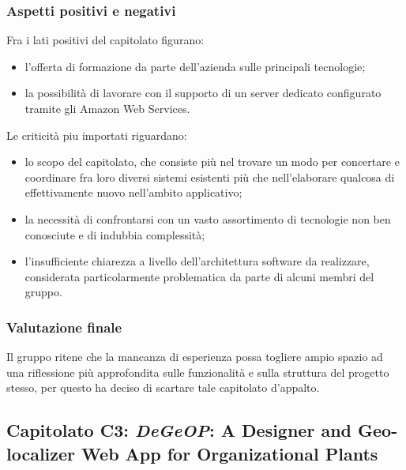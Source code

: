 		\subsubsection{Aspetti positivi e negativi}
		Fra i lati positivi del capitolato figurano:
		\begin{itemize}
			\item l'offerta di formazione da parte dell'azienda sulle principali tecnologie;
			\item la possibilità di lavorare con il supporto di un server dedicato configurato tramite gli Amazon Web Services.
		\end{itemize}
		Le criticità piu importati riguardano:
		\begin{itemize}
			\item lo scopo del capitolato, che consiste più nel trovare un modo per concertare e coordinare fra loro diversi sistemi 
			esistenti più che nell'elaborare qualcosa di effettivamente nuovo nell'ambito applicativo;
			\item la necessità di confrontarsi con un vasto assortimento di tecnologie non ben conosciute e di indubbia complessità;
			\item l'insufficiente chiarezza a livello dell'architettura software da realizzare, considerata particolarmente problematica da 
			parte di alcuni membri del gruppo.
		\end{itemize}
		\subsubsection{Valutazione finale}
		Il gruppo ritene che la mancanza di esperienza possa togliere ampio spazio ad una riflessione più approfondita sulle funzionalità e sulla 
		struttura del progetto stesso, per questo ha deciso di scartare tale capitolato d'appalto.
		
	\subsection{Capitolato C3: \emph{DeGeOP}: A Designer and Geo-localizer Web App for Organizational Plants}
